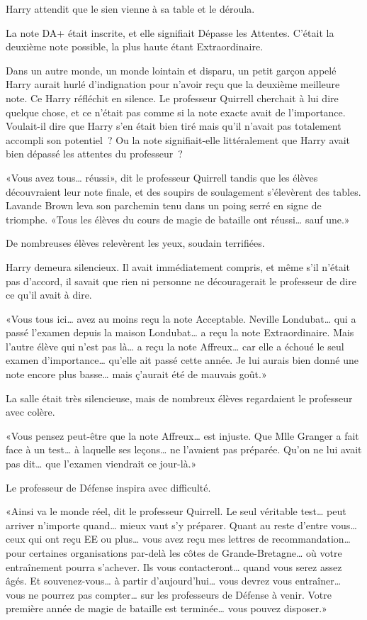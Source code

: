 Harry attendit que le sien vienne à sa table et le déroula.

La note DA+ était inscrite, et elle signifiait Dépasse les Attentes. C'était la deuxième note possible, la plus haute étant Extraordinaire.

Dans un autre monde, un monde lointain et disparu, un petit garçon appelé Harry aurait hurlé d'indignation pour n'avoir reçu que la deuxième meilleure note. Ce Harry réfléchit en silence. Le professeur Quirrell cherchait à lui dire quelque chose, et ce n'était pas comme si la note exacte avait de l'importance. Voulait-il dire que Harry s'en était bien tiré mais qu'il n'avait pas totalement accompli son potentiel~? Ou la note signifiait-elle littéralement que Harry avait bien dépassé les attentes du professeur~?

«Vous avez tous… réussi», dit le professeur Quirrell tandis que les élèves découvraient leur note finale, et des soupirs de soulagement s'élevèrent des tables. Lavande Brown leva son parchemin tenu dans un poing serré en signe de triomphe. «Tous les élèves du cours de magie de bataille ont réussi… sauf une.»

De nombreuses élèves relevèrent les yeux, soudain terrifiées.

Harry demeura silencieux. Il avait immédiatement compris, et même s'il n'était pas d'accord, il savait que rien ni personne ne découragerait le professeur de dire ce qu'il avait à dire.

«Vous tous ici… avez au moins reçu la note Acceptable. Neville Londubat… qui a passé l'examen depuis la maison Londubat… a reçu la note Extraordinaire. Mais l'autre élève qui n'est pas là… a reçu la note Affreux… car elle a échoué le seul examen d'importance… qu'elle ait passé cette année. Je lui aurais bien donné une note encore plus basse… mais ç'aurait été de mauvais goût.»

La salle était très silencieuse, mais de nombreux élèves regardaient le professeur avec colère.

«Vous pensez peut-être que la note Affreux… est injuste. Que Mlle Granger a fait face à un test… à laquelle ses leçons… ne l'avaient pas préparée. Qu'on ne lui avait pas dit… que l'examen viendrait ce jour-là.»

Le professeur de Défense inspira avec difficulté.

«Ainsi va le monde réel, dit le professeur Quirrell. Le seul véritable test… peut arriver n'importe quand… mieux vaut s'y préparer. Quant au reste d'entre vous… ceux qui ont reçu EE ou plus… vous avez reçu mes lettres de recommandation… pour certaines organisations par-delà les côtes de Grande-Bretagne… où votre entraînement pourra s'achever. Ils vous contacteront… quand vous serez assez âgés. Et souvenez-vous… à partir d'aujourd'hui… vous devrez vous entraîner… vous ne pourrez pas compter… sur les professeurs de Défense à venir. Votre première année de magie de bataille est terminée… vous pouvez disposer.»

